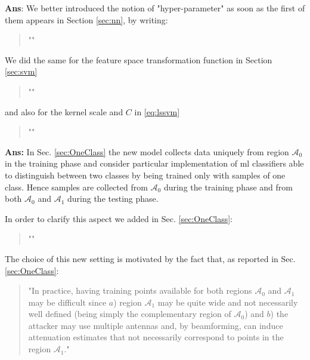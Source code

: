 \documentclass[draftcls,onecolumn,12pt]{IEEEtran}
\newcounter{revc}
\newcommand{\revp}[1]{\zref[revcontent]{#1}}
\newcommand{\A}[1]{\mathcal{A}_#1}
\begin{document}
{
{\bf Ans}: We better introduced the notion of "hyper-parameter" as soon as the first of them appears in Section \ref{sec:nn}, by writing:
\begin{quote}
	"\revp{hyper1}"
\end{quote}
We did the same for the feature space transformation function in Section \ref{sec:svm}
\begin{quote}
	"\revp{hyper2}"
\end{quote}
 and also for the kernel scale and $C$ in \eqref{eq:lssvm}
 \begin{quote}
 	"\revp{hyper3}"
 \end{quote} 

\vspace{5mm} %
\begin{framed}
\end{framed}

{\bf Ans:} In Sec. \ref{sec:OneClass} the new model collects data uniquely from region $\mathcal{A}_0$ in the training phase and consider particular implementation of \ac{ml} classifiers able to distinguish between two classes by being trained only with samples of one class. Hence samples are collected from $\mathcal{A}_0$ during the training phase and from both $\mathcal{A}_0$ and $\mathcal{A}_1$ during the testing phase. 

In order to clarify this aspect we added in Sec. \ref{sec:OneClass}:
\begin{quote}
"\revp{oneClass}"
\end{quote}

The choice of this new setting is motivated by the fact that, as reported in Sec. \ref{sec:OneClass}:
\begin{quote}
"In practice, having training points available for both regions $\mathcal A_0$ and ${\mathcal A}_1$ may be difficult since $a$) region $\A{1}$ may be quite wide and not necessarily well defined (being simply the complementary region of $\mathcal A_0$) and $b$) the attacker may use multiple antennas and, by beamforming, can induce attenuation estimates that not necessarily correspond to points in the region $\A{1}$."
\end{quote}


\vspace{5mm} %
\begin{framed}
\end{framed}

}
\end{document}
